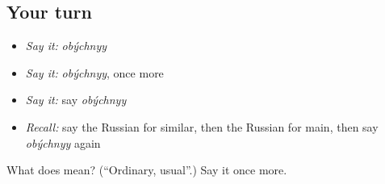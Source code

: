 \subsection*{Your turn}
\begin{itemize}
\raggedright
  \item \emph{Say it:} \emph{obýchnyy}
  \item \emph{Say it:} \emph{obýchnyy}, once more
  \item \emph{Say it:} say \emph{obýchnyy}
  \item \emph{Recall:} say the Russian for similar, then the Russian for main, then say \emph{obýchnyy} again
\end{itemize}

\begin{tcolorbox}[breakable,colback=teal!4,colframe=teal!35!black,title={Before you move on}]
What does  mean? (\textquotedblleft{}Ordinary, usual\textquotedblright{}.) Say it once more.
\end{tcolorbox}
